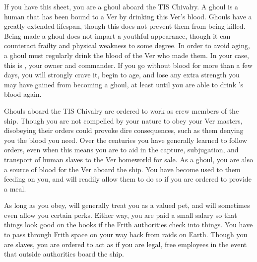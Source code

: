 \documentclass[blue]{guildcamp4}
\begin{document}
\name{\bGhouls{}}

If you have this sheet, you are a ghoul aboard the TIS Chivalry. A ghoul is a human that has been bound to a Ver by drinking this Ver's blood. Ghouls have a greatly extended lifespan, though this does not prevent them from being killed. Being made a ghoul does not impart a youthful appearance, though it can counteract frailty and physical weakness to some degree. In order to avoid aging, a ghoul must regularly drink the blood of the Ver who made them. In your case, this is \cVone{}, your owner and commander. If you go without \cVone{\their} blood for more than a few days, you will strongly crave it, begin to age, and lose any extra strength you may have gained from becoming a ghoul, at least until you are able to drink \cVone{}'s blood again.

Ghouls aboard the TIS Chivalry are ordered to work as crew members of the ship. Though you are not compelled by your nature to obey your Ver masters, disobeying their orders could provoke dire consequences, such as them denying you the blood you need. Over the centuries you have generally learned to follow orders, even when this means you are to aid in the capture, subjugation, and transport of human slaves to the Ver homeworld for sale. As a ghoul, you are also a source of blood for the Ver aboard the ship. You have become used to them feeding on you, and will readily allow them to do so if you are ordered to provide a meal.

As long as you obey, \cVone{} will generally treat you as a valued pet, and will sometimes even allow you certain perks. Either way, you are paid a small salary so that things look good on the books if the Frith authorities check into things. You have to pass through Frith space on your way back from raids on Earth. Though you are slaves, you are ordered to act as if you are legal, free employees in the event that outside authorities board the ship.
\end{document}
